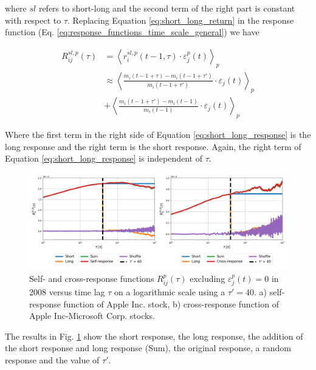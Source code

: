 where $sl$ refers to short-long and the second term of the right part is constant with respect to $\tau$.
Replacing Equation \ref{eq:short_long_return} in the response function (Eq. \ref{eq:response_functions_time_scale_general}) we have

\begin{align}\label{eq:short_long_response}
    R^{sl,p}_{ij}\left(\tau\right)&=\left\langle r^{sl,p}_{i}\left(t - 1, \tau\right)
    \cdot\varepsilon^{p}_{j}\left(t\right)\right\rangle _{p} \nonumber \\
    &\approx\left\langle \frac{m_{i}\left(t - 1 +\tau\right)-m_{i}
    \left(t - 1 +\tau'\right)} {m_{i}\left(t - 1 +\tau'\right)}\cdot\varepsilon_{j}
    \left(t\right)\right\rangle _{p} \nonumber \\
    & +\left\langle \frac{m_{i}
    \left(t - 1 +\tau'\right)-m_{i}\left(t - 1\right)}{m_{i}\left(t - 1\right)}
    \cdot\varepsilon_{j}\left(t\right)\right\rangle _{p}
\end{align}

Where the first term in the right side of Equation \ref{eq:short_long_response}
is the long response and the right term is the short response. Again, the right
term of Equation \ref{eq:short_long_response} is independent of $\tau$.

\begin{figure}[htbp]
    \centering
    \includegraphics[width=\textwidth]
    {figures/05_short_long_GOOG_MA.png}
    \caption{Self- and cross-response functions $R^{p}_{ij}\left(\tau\right)$ excluding
            $\varepsilon^{p}_{j}\left(t\right) = 0$ in 2008 versus time lag $\tau$ on a
            logarithmic scale using a $\tau'=40$. a) self-response function of Apple Inc. stock,
            b) cross-response function of Apple Inc-Microsoft Corp. stocks.}
    \label{fig:short_long_responses}
\end{figure}

The results in Fig. \ref{fig:short_long_responses} show the short response, the
long response, the addition of the short response and long response (Sum), the
original response, a random response and the value of $\tau'$.

